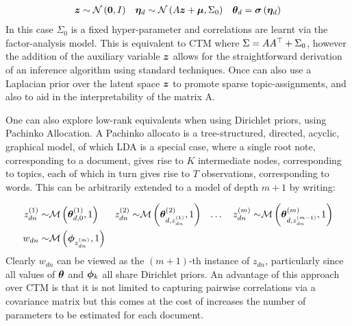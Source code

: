 \begin{align}
\bm z & \sim \mathcal{N} \left( {\bm 0}, {I} \right) & \bm \eta_d & \sim \mathcal{N} \left( {A\bm z + \bm \mu}, {\Sigma_0} \right) & { \bm \theta_d } = \bm \sigma\left(\bm \eta_d\right) 
\end{align}
In this case $\Sigma_0$ is a fixed hyper-parameter and correlations are learnt via the factor-analysis model. This is equivalent to CTM where $\Sigma = AA^\top + \Sigma_0$, however the addition of the auxiliary variable $\bm z$ allows for the straightforward derivation of an inference algorithm using standard techniques. Once can also use a Laplacian prior over the latent space $\bm z$ to promote sparse topic-assignments\cite{Putthividhya2009}, and also to aid in the interpretability of the matrix A.

One can also explore low-rank equivalents when using Dirichlet priors, using Pachinko Allocation\cite{Li2006}. A Pachinko allocato is a tree-structured, directed, acyclic, graphical model, of which LDA is a special case,  where a single root note, corresponding to a document, gives rise to $K$ intermediate nodes, corresponding to topics, each of which in turn gives rise to $T$ observations, corresponding to words. This can be arbitrarily extended to a model of depth $m+1$ by writing:

\begin{align}
z^{(1)}_{dn} \sim & \mathcal{M} \left( {\bm \theta_{d,0}^{(1)}},{1} \right) &
z^{(2)}_{dn} \sim & \mathcal{M} \left( {\bm \theta^{(2)}_{d, z^{(1)}_{dn}}},{1} \right) & \ldots \quad
z^{(m)}_{dn} \sim & \mathcal{M} \left( {\bm \theta^{(m)}_{d, z^{(m-1)}_{dn}}},{1} \right) \\
w_{dn} \sim & \mathcal{M} \left( {\bm \phi_{z^{(m)}_{dn}}},{1} \right)
\end{align}
Clearly $w_{dn}$ can be viewed as the $(m+1)$-th instance of $z_{dn}$, particularly since all values of $\bm \theta$ and $\bm \phi_k$ all share Dirichlet priors. An advantage of this approach over CTM is that it is not limited to capturing pairwise correlations via a covariance matrix but this comes at the cost of increases the number of parameters to be estimated for each document.


